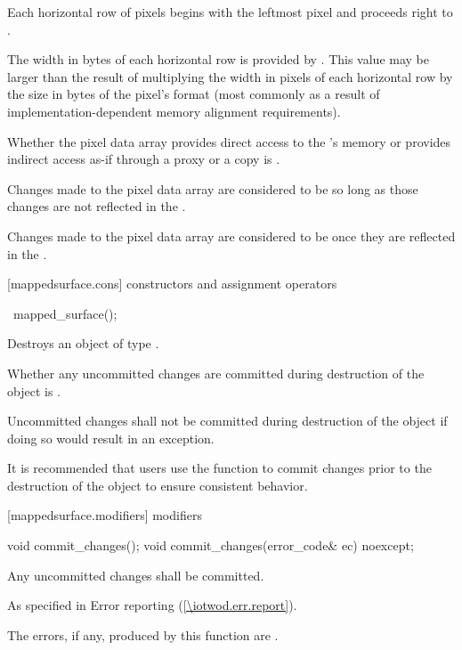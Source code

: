 \pnum
Each horizontal row of pixels begins with the leftmost pixel and proceeds right to .

\pnum
The width in bytes of each horizontal row is provided by . This value may be larger than the result of multiplying the width in pixels of each horizontal row by the size in bytes of the pixel's format (most commonly as a result of implementation-dependent memory alignment requirements).

\pnum
Whether the pixel data array provides direct access to the \underlyingsurface's memory or provides indirect access as-if through a proxy or a copy is \unspecnorm.

\pnum
Changes made to the pixel data array are considered to be  so long as those changes are not reflected in the \underlyingsurface.

\pnum
Changes made to the pixel data array are considered to be  once they are reflected in the \underlyingsurface.

 [mappedsurface.cons] { constructors and assignment operators}

\begin{itemdecl}
~mapped_surface();
\end{itemdecl}
\begin{itemdescr}
\pnum
\effects
Destroys an object of type . 

\pnum
\remarks
Whether any uncommitted changes are committed during destruction of the  object is \unspecnorm.

\pnum
Uncommitted changes shall not be committed during destruction of the  object if doing so would result in an exception.

\pnum
\realnotes
It is recommended that users use the  function to commit changes prior to the destruction of the  object to ensure consistent behavior.
\end{itemdescr}

 [mappedsurface.modifiers]{ modifiers}

\begin{itemdecl}
void commit_changes();
void commit_changes(error_code& ec) noexcept;
\end{itemdecl}
\begin{itemdescr}
\pnum
\effects
Any uncommitted changes shall be committed.

\pnum
\throws
As specified in Error reporting (\ref{\iotwod.err.report}).

\pnum
\errors
The errors, if any, produced by this function are .
\end{itemdescr}

